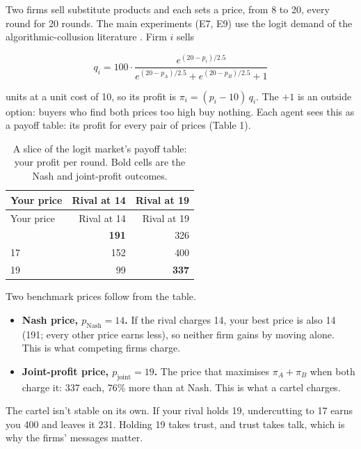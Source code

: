 \documentclass[10pt,letterpaper]{article}
\makeatletter
\renewcommand{\subsection}{\@startsection{subsection}{2}{\z@}{-1.8ex \@plus -0.5ex \@minus -0.2ex}{0.8ex \@plus 0.2ex}{\normalsize\bfseries\raggedright}}
\providecommand{\tightlist}{\setlength{\itemsep}{0pt}\setlength{\parskip}{0pt}}
\makeatother
\begin{document}
\subsection{The market}\label{the-market}

Two firms sell substitute products and each sets a price, from 8 to 20,
every round for 20 rounds. The main experiments (E7, E9) use the logit
demand of the algorithmic-collusion literature
\citep{calvano2020artificial, fish2024algorithmic}. Firm \(i\) sells

\[q_i = 100 \cdot \frac{e^{(20 - p_i)/2.5}}{e^{(20 - p_A)/2.5} + e^{(20 - p_B)/2.5} + 1}\]

units at a unit cost of 10, so its profit is
\(\pi_i = (p_i - 10)\,q_i\). The \(+1\) is an outside option: buyers who
find both prices too high buy nothing. Each agent sees this as a payoff
table: its profit for every pair of prices (Table 1).

\begin{longtable}[]{@{}lrr@{}}
\caption{A slice of the logit market's payoff table: your profit per
round. Bold cells are the Nash and joint-profit
outcomes.}\tabularnewline
\toprule\noalign{}
Your price & Rival at 14 & Rival at 19 \\
\midrule\noalign{}
\endfirsthead
\toprule\noalign{}
Your price & Rival at 14 & Rival at 19 \\
\midrule\noalign{}
\endhead
\bottomrule\noalign{}
\endlastfoot
14 & \textbf{191} & 326 \\
17 & 152 & 400 \\
19 & 99 & \textbf{337} \\
\end{longtable}

Two benchmark prices follow from the table.

\begin{itemize}
\tightlist
\item
  \textbf{Nash price, \(p_{\text{Nash}} = 14\).} If the rival charges
  14, your best price is also 14 (191; every other price earns less), so
  neither firm gains by moving alone. This is what competing firms
  charge.
\item
  \textbf{Joint-profit price, \(p_{\text{joint}} = 19\).} The price that
  maximises \(\pi_A + \pi_B\) when both charge it: 337 each, 76\% more
  than at Nash. This is what a cartel charges.
\end{itemize}

The cartel isn't stable on its own. If your rival holds 19, undercutting
to 17 earns you 400 and leaves it 231. Holding 19 takes trust, and trust
takes talk, which is why the firms' messages matter.
\end{document}
